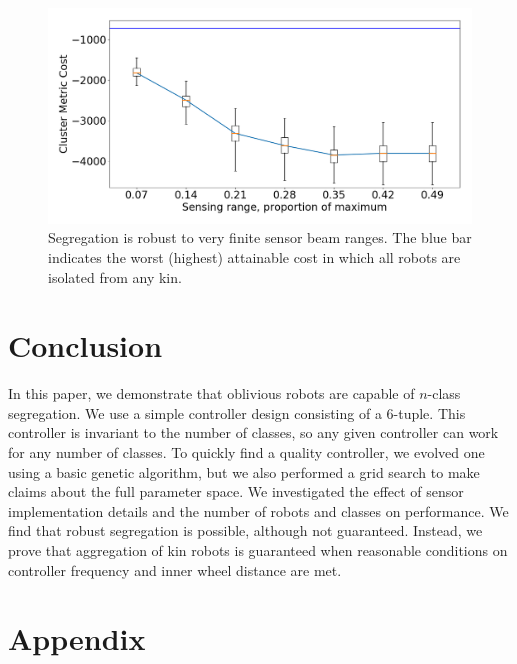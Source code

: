 \documentclass[conference]{IEEEtran}
\begin{document}
    \begin{figure}
      \centering
      \includegraphics[width=1\linewidth]{./images/beam_length.png}
      \caption{Segregation is robust to very finite sensor beam ranges. The blue bar indicates the worst (highest) attainable cost in which all robots are isolated from any kin.}
      \label{fig:beam_range}
    \end{figure}

\section{Conclusion}

  In this paper, we demonstrate that oblivious robots are capable of $n$-class segregation. We use a simple controller design consisting of a 6-tuple. This controller is invariant to the number of classes, so any given controller can work for any number of classes. To quickly find a quality controller, we evolved one using a basic genetic algorithm, but we also performed a grid search to make claims about the full parameter space. We investigated the effect of sensor implementation details and the number of robots and classes on performance. We find that robust segregation is possible, although not guaranteed. Instead, we prove that aggregation of kin robots is guaranteed when reasonable conditions on controller frequency and inner wheel distance are met.




\onecolumn
\appendix
\section{Appendix}
\end{document}
